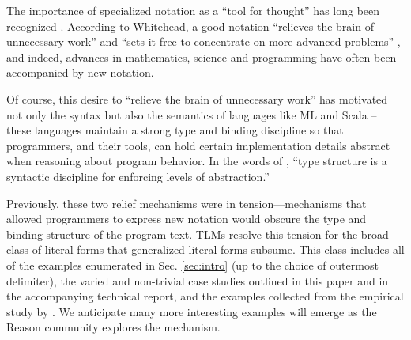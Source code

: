 \documentclass[acmsmall]{acmart}
\begin{document}
The importance of specialized notation as a ``tool for thought'' has long been recognized \cite{DBLP:journals/cacm/Iverson80}. According to Whitehead, a good notation ``relieves the brain of unnecessary work'' and ``sets it free to concentrate on more advanced problems'' \cite{cajori1928history}, and indeed, advances in mathematics, science and programming have often been accompanied by new notation. 

Of course, this desire to ``relieve the brain of unnecessary work'' has motivated not only the syntax but also the semantics of languages like ML and Scala -- these languages maintain a strong type and binding discipline so that programmers, and their tools, can hold certain implementation details abstract when reasoning about program behavior.  In the words of \citet{B304}, ``type structure is a syntactic discipline for enforcing levels of abstraction.''

Previously, these two relief mechanisms were in tension---mechanisms  that allowed programmers to express new notation would obscure the type and binding structure of the program text. TLMs resolve this tension for the broad class of literal forms that generalized literal forms subsume. This class includes all of the examples enumerated in Sec. \ref{sec:intro} (up to the choice of outermost delimiter), the varied and non-trivial case studies outlined in this paper and in the accompanying technical report, and the examples collected from the empirical study by \citet{TSLs}. We anticipate many more interesting examples will emerge as the Reason community explores the mechanism.
\end{document}
